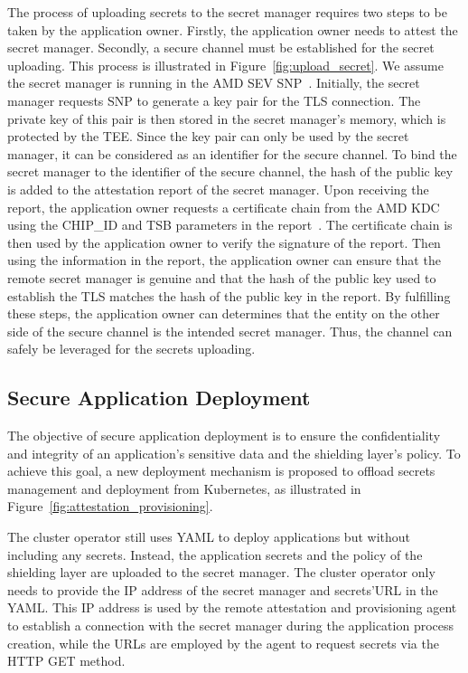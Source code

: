 The process of uploading secrets to the secret manager requires two steps to be taken by the application owner. Firstly, the application owner needs to attest the secret manager. Secondly, a secure channel must be established for the secret uploading.
This process is illustrated in Figure~\ref{fig:upload_secret}. We assume the secret manager is running in the AMD SEV SNP~\cite*{SEV_SNP_white_book}. Initially, 
the secret manager requests SNP to generate a key pair for the TLS connection. The private key of this pair is then stored in the secret manager's memory, which is protected by the TEE.
Since the key pair can only be used by the secret manager, it can be considered as an identifier for the secure channel. To bind the secret manager to the identifier of the secure channel,
the hash of the public key is added to the attestation report of the secret manager. Upon receiving the report, the application owner requests a certificate chain from the AMD KDC using 
the CHIP\_ID and TSB parameters in the report~\cite*{snp_kdc}. The certificate chain is then used by the application owner to verify the signature of the report. Then using the information in the report,
the application owner can ensure that the remote secret manager is genuine and that the hash of the public key used to establish the TLS matches the hash of the public key in the report. 
By fulfilling these steps, the application owner can determines that the entity on the other side of the secure channel is the intended secret manager. Thus, the channel can 
safely be leveraged for the secrets uploading.

\subsection{Secure Application Deployment}

The objective of secure application deployment is to ensure the confidentiality and integrity of an application's sensitive data and the shielding layer's policy. To achieve this goal, a new deployment mechanism is proposed to offload secrets 
management and deployment from Kubernetes, as illustrated in Figure~\ref{fig:attestation_provisioning}.

The cluster operator still uses YAML to deploy applications but without including any secrets. Instead, the application secrets and the policy of the shielding layer are uploaded to the secret manager. The cluster operator only needs to provide the 
IP address of the secret manager and secrets'URL in the YAML. This IP address is used by the remote attestation and provisioning agent to establish a connection with the secret manager during the application process creation, while the URLs are 
employed by the agent to request secrets via the HTTP GET method.

